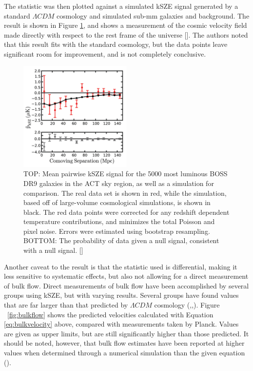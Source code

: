 \documentclass[manuscript]{aastex}
\begin{document}
The statistic was then plotted against a simulated kSZE signal generated by a standard $\Lambda CDM$  cosmology and simulated sub-mm galaxies and background.
The result is shown in Figure \ref{fig:hand1}, and shows a measurement of the cosmic velocity field made directly with respect to the rest frame of the universe [\cite{Hand2012}]. The authors noted that this result fits with the standard cosmology, but the data points leave significant room for improvement, and is not completely conclusive. 
\begin{figure}
  \vspace{-0.8cm}
    \begin{center}
      \includegraphics[width=0.5\textwidth]{hand1.png}
    \end{center}
\caption[Mean Pairwise Momentum of BOSS DR9 Selected Clusters using kSZE -(\cite{Hand2012})]{TOP: Mean pairwise kSZE signal for the 5000 most luminous BOSS DR9 galaxies in the ACT sky region, as well as a simulation for comparison. The real data set is shown in red, while the simulation, based off of large-volume cosmological simulations, is shown in black. The red data points were corrected for any redshift dependent temperature contributions, and minimizes the total Poisson and pixel noise. Errors were estimated using bootstrap resampling. BOTTOM: The probability of data given a null signal, consistent with a null signal. [\cite{Hand2012}]}
\label{fig:hand1}
\vspace{-0.4cm}
\end{figure}
Another caveat to the result is that the statistic used is differential, making it less sensitive to systematic effects, but also not allowing for a direct measurement of bulk flow.  
Direct measurements of bulk flow have been accomplished by several groups using kSZE, but with varying results. Several groups have found values that are far larger than that predicted by \(\Lambda CDM\) cosmology (\cite{Kashlinsky2008},\cite{Watkins2009},\cite{Lavaux2010}). Figure ~\ref{fig:bulkflow} shows the predicted velocities calculated with Equation \ref{eq:bulkvelocity} above, compared with measurements taken by Planck. Values are given as upper limits, but are still significantly higher than those predicted. It should be noted, however, that bulk flow estimates have been reported at higher values when determined through a numerical simulation than the given equation (\cite{Kitayama2014}).
\end{document}
